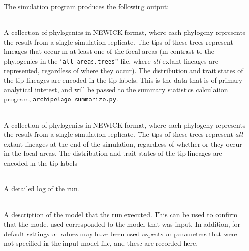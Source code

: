 \documentclass[11pt,openany]{memoir} %
\let\Item\item
\newcommand\SpecialItem{\renewcommand\item[1][]{\Item[\textbullet~\bfseries##1]}}
\begin{document}
The simulation program produces the following output:
\begin{description}
    \label{sec:description-of-output-files}
    \SpecialItem
        \item[\texttt{<OUTPUT-PREFIX>.focal-areas.trees}] \hfill \\
            A collection of phylogenies in NEWICK format, where each phylogeny represents the result from a single simulation replicate.
            The tips of these trees represent lineages that occur in at least one of the focal areas (in contrast to the phylogenies in the ``\texttt{all-areas.trees}'' file, where \textit{all} extant lineages are represented, regardless of where they occur).
            The distribution and trait states of the tip lineages are encoded in the tip labels.
            This is the data that is of primary analytical interest, and will be passed to the summary statistics calculation program, \texttt{archipelago-summarize.py}.
        \item[\texttt{<OUTPUT-PREFIX>.all-areas.trees}] \hfill \\
            A collection of phylogenies in NEWICK format, where each phylogeny represents the result from a single simulation replicate.
            The tips of these trees represent \textit{all} extant lineages at the end of the simulation, regardless of whether or they occur in the focal areas.
            The distribution and trait states of the tip lineages are encoded in the tip labels.
        \item[\texttt{<OUTPUT-PREFIX>.log}] \hfill \\
            A detailed log of the run.
        \item[\texttt{<OUTPUT-PREFIX>.model.json}] \hfill \\
            A description of the model that the run executed. This can be used to confirm that the model used corresponded to the model that was input. In addition, for default settings or values may have been used aspects or parameters that were not specified in the input model file, and these are recorded here.
\end{description}
\end{document}
